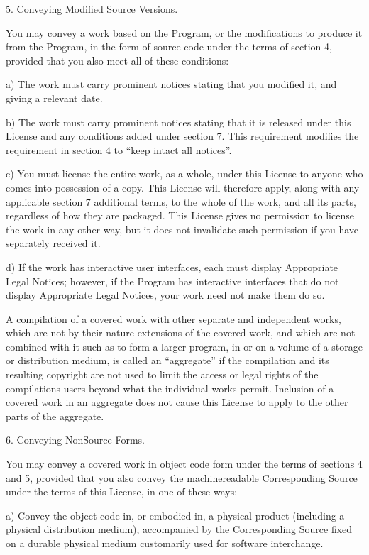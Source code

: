 \documentclass[letterpaper,10pt,english]{sphinxmanual}
\begin{document}
\begin{sphinxVerbatim}[commandchars=\\\{\}]
 5. Conveying Modified Source Versions.

   You may convey a work based on the Program, or the modifications to produce
   it from the Program, in the form of source code under the terms of section
   4, provided that you also meet all of these conditions:

   a) The work must carry prominent notices stating that you modified it, and
      giving a relevant date.

   b) The work must carry prominent notices stating that it is released under
      this License and any conditions added under section 7. This requirement
      modifies the requirement in section 4 to “keep intact all notices”.

   c) You must license the entire work, as a whole, under this License to
      anyone who comes into possession of a copy. This License will therefore
      apply, along with any applicable section 7 additional terms, to the whole
      of the work, and all its parts, regardless of how they are packaged. This
      License gives no permission to license the work in any other way, but it
      does not invalidate such permission if you have separately received it.

   d) If the work has interactive user interfaces, each must display
      Appropriate Legal Notices; however, if the Program has interactive
      interfaces that do not display Appropriate Legal Notices, your work need
      not make them do so.

   A compilation of a covered work with other separate and independent works,
   which are not by their nature extensions of the covered work, and which are
   not combined with it such as to form a larger program, in or on a volume of
   a storage or distribution medium, is called an “aggregate” if the
   compilation and its resulting copyright are not used to limit the access or
   legal rights of the compilation\PYGZsq{}s users beyond what the individual works
   permit. Inclusion of a covered work in an aggregate does not cause this
   License to apply to the other parts of the aggregate.

 6. Conveying Non\PYGZhy{}Source Forms.

   You may convey a covered work in object code form under the terms of
   sections 4 and 5, provided that you also convey the machine\PYGZhy{}readable
   Corresponding Source under the terms of this License, in one of these ways:

   a) Convey the object code in, or embodied in, a physical product (including
      a physical distribution medium), accompanied by the Corresponding Source
      fixed on a durable physical medium customarily used for software
      interchange.


\end{sphinxVerbatim}
\end{document}

